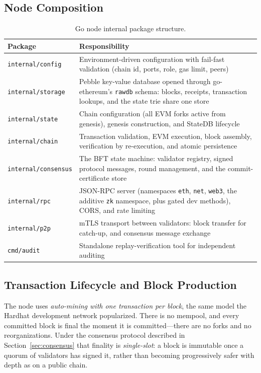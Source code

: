 \subsection{Node Composition}

\begin{table}[H]
\centering
\caption{Go node internal package structure.}
\label{tab:go-packages}
\begin{tabular}{|l|p{8.5cm}|}
\hline
\textbf{Package} & \textbf{Responsibility} \\
\hline
\texttt{internal/config} & Environment-driven configuration with fail-fast validation (chain id, ports, role, gas limit, peers) \\
\hline
\texttt{internal/storage} & Pebble key-value database opened through go-ethereum's \texttt{rawdb} schema: blocks, receipts, transaction lookups, and the state trie share one store \\
\hline
\texttt{internal/state} & Chain configuration (all EVM forks active from genesis), genesis construction, and StateDB lifecycle \\
\hline
\texttt{internal/chain} & Transaction validation, EVM execution, block assembly, verification by re-execution, and atomic persistence \\
\hline
\texttt{internal/consensus} & The BFT state machine: validator registry, signed protocol messages, round management, and the commit-certificate store \\
\hline
\texttt{internal/rpc} & JSON-RPC server (namespaces \texttt{eth}, \texttt{net}, \texttt{web3}, the additive \texttt{zk} namespace, plus gated dev methods), CORS, and rate limiting \\
\hline
\texttt{internal/p2p} & mTLS transport between validators: block transfer for catch-up, and consensus message exchange \\
\hline
\texttt{cmd/audit} & Standalone replay-verification tool for independent auditing \\
\hline
\end{tabular}
\end{table}

\subsection{Transaction Lifecycle and Block Production}

The node uses \emph{auto-mining with one transaction per block}, the same model the Hardhat development network popularized. There is no mempool, and every committed block is final the moment it is committed---there are no forks and no reorganizations. Under the consensus protocol described in Section~\ref{sec:consensus} that finality is \emph{single-slot}: a block is immutable once a quorum of validators has signed it, rather than becoming progressively safer with depth as on a public chain.

